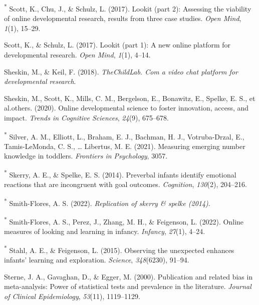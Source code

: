 \documentclass[
  man,floatsintext]{apa6}
\newlength{\cslhangindent}
\newlength{\cslentryspacingunit} %
\newenvironment{CSLReferences}[2] %
 {%
  \setlength{\parindent}{0pt}
  \ifodd #1
  \let\oldpar\par
  \def\par{\hangindent=\cslhangindent\oldpar}
  \fi
  \setlength{\parskip}{#2\cslentryspacingunit}
 }%
 {}
\begin{document}
\begin{CSLReferences}{1}{0}
\leavevmode{}%
\textsuperscript{*} Scott, K., Chu, J., \& Schulz, L. (2017). Lookit (part 2): Assessing the viability of online developmental research, results from three case studies. \emph{Open Mind}, \emph{1}(1), 15--29.

\leavevmode{}%
Scott, K., \& Schulz, L. (2017). Lookit (part 1): A new online platform for developmental research. \emph{Open Mind}, \emph{1}(1), 4--14.

\leavevmode{}%
Sheskin, M., \& Keil, F. (2018). \emph{TheChildLab. Com a video chat platform for developmental research}.

\leavevmode{}%
Sheskin, M., Scott, K., Mills, C. M., Bergelson, E., Bonawitz, E., Spelke, E. S., et al.others. (2020). Online developmental science to foster innovation, access, and impact. \emph{Trends in Cognitive Sciences}, \emph{24}(9), 675--678.

\leavevmode{}%
\textsuperscript{*} Silver, A. M., Elliott, L., Braham, E. J., Bachman, H. J., Votruba-Drzal, E., Tamis-LeMonda, C. S., \ldots{} Libertus, M. E. (2021). Measuring emerging number knowledge in toddlers. \emph{Frontiers in Psychology}, 3057.

\leavevmode{}%
\textsuperscript{*} Skerry, A. E., \& Spelke, E. S. (2014). Preverbal infants identify emotional reactions that are incongruent with goal outcomes. \emph{Cognition}, \emph{130}(2), 204--216.

\leavevmode{}%
\textsuperscript{*} Smith-Flores, A. S. (2022). \emph{Replication of skerry \& spelke (2014)}.

\leavevmode{}%
\textsuperscript{*} Smith-Flores, A. S., Perez, J., Zhang, M. H., \& Feigenson, L. (2022). Online measures of looking and learning in infancy. \emph{Infancy}, \emph{27}(1), 4--24.

\leavevmode{}%
\textsuperscript{*} Stahl, A. E., \& Feigenson, L. (2015). Observing the unexpected enhances infants' learning and exploration. \emph{Science}, \emph{348}(6230), 91--94.

\leavevmode{}%
Sterne, J. A., Gavaghan, D., \& Egger, M. (2000). Publication and related bias in meta-analysis: Power of statistical tests and prevalence in the literature. \emph{Journal of Clinical Epidemiology}, \emph{53}(11), 1119--1129.


\end{CSLReferences}
\end{document}
